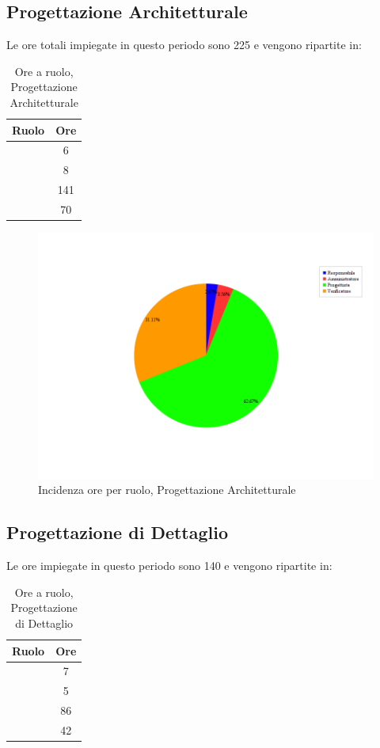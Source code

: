 \subsection{Progettazione Architetturale}
Le ore totali impiegate in questo periodo sono 225 e vengono ripartite in:
\begin{table}[H]
	\begin{center}
		\begin{tabular}{|c|c|}
			\hline
			\textbf{Ruolo}	& \textbf{Ore} \\
			\hline
			\Res	&	6	\\
			\hline
			\Amm	&	8	\\
			\hline
			\Prog		&	141	\\
			\hline
			\Ver	&	70	\\
			\hline
		\end{tabular}
	\end{center}
	\caption{Ore a ruolo, Progettazione Architetturale}
\end{table}

\begin{figure}[H]
	\centering
	\includegraphics[scale=0.3]{immagini/Grafi/OreRuoloPA}
	\caption{Incidenza ore per ruolo, Progettazione Architetturale}
\end{figure}


\subsection{Progettazione di Dettaglio}
Le ore impiegate in questo periodo sono 140 e vengono ripartite in:
\begin{table}[H]
	\begin{center}
		\begin{tabular}{|c|c|}
			\hline
			\textbf{Ruolo}	& \textbf{Ore} \\
			\hline
			\Res	&	7	\\
			\hline
			\Amm	&	5	\\
			\hline
			\Prog		&	86	\\
			\hline
			\Ver	&	42	\\
			\hline
		\end{tabular}
	\end{center}
	\caption{Ore a ruolo, Progettazione di Dettaglio}
\end{table}

